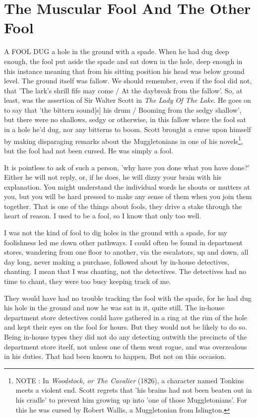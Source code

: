 \chapter{The Muscular Fool And The Other Fool}

A FOOL DUG a hole in the ground with a spade. When he had dug deep enough, the fool put aside the spade and sat down in the hole, deep enough in this instance meaning that from his sitting position his head was below ground level. The ground itself was fallow. We should remember, even if the fool did not, that 'The lark's shrill fife may come / At the daybreak from the fallow'. So, at least, was the assertion of Sir Walter Scott in \emph{The Lady Of The Lake}. He goes on to say that 'the bittern sound[s] his drum / Booming from the sedgy shallow', but there were no shallows, sedgy or otherwise, in this fallow where the fool sat in a hole he'd dug, nor any bitterns to boom. Scott brought a curse upon himself by making disparaging remarks about the Muggletonians in one of his novels\footnote{NOTE : In \emph{Woodstock, or The Cavalier} (1826), a character named Tonkins meets a violent end. Scott regrets that 'his brains had not been beaten out in his cradle' to prevent him growing up into 'one of those Muggletonians'. For this he was cursed by Robert Wallis, a Muggletonian from Islington.}, but the fool had not been cursed. He was simply a fool.

It is pointless to ask of such a person, 'why have you done what you have done?' Either he will not reply, or, if he does, he will dizzy your brain with his explanation. You might understand the individual words he shouts or mutters at you, but you will be hard pressed to make any sense of them when you join them together. That is one of the things about fools, they drive a stake through the heart of reason. I used to be a fool, so I know that only too well.

I was not the kind of fool to dig holes in the ground with a spade, for my foolishness led me down other pathways. I could often be found in department stores, wandering from one floor to another, via the escalators, up and down, all day long, never making a purchase, followed about by in-house detectives, chanting. I mean that I was chanting, not the detectives. The detectives had no time to chant, they were too busy keeping track of me.

They would have had no trouble tracking the fool with the spade, for he had dug his hole in the ground and now he was sat in it, quite still. The in-house department store detectives could have gathered in a ring at the rim of the hole and kept their eyes on the fool for hours. But they would not be likely to do so. Being in-house types they did not do any detecting outwith the precincts of the department store itself, not unless one of them went rogue, and was overzealous in his duties. That had been known to happen. But not on this occasion.

